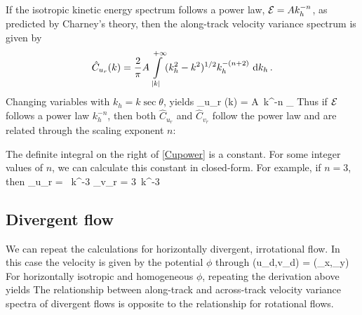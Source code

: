 \documentclass[12pt]{article}
\begin{document}
If the isotropic kinetic energy spectrum follows a power law, $\mathcal{E} = A k_h^{-n}$, as predicted by Charney's theory, then the along-track velocity variance spectrum is given by 
\begin{align}
 \hat{C}_{u_r} (k) = \frac{2}{\pi} A \int\limits_{|k|}^{+\infty} (k_h^2 - k^2)^{1/2} k_h^{-(n +2)}  \,\,{\rm d} k_h\, .
\end{align}
Changing variables with $k_h = k \sec \theta$, yields 
\beq \label{Cupower}
 _{u_r} (k) =   A\, k^{-n} _{}\per 
\eeq
Thus if $\mathcal{E}$ follows a power law $k_h^{-n}$, then both $\hat{C}_{u_r}$ and $\hat{C}_{v_r}$ follow the  power law and are related through the scaling exponent $n$:
\beq 
{} \per 
\eeq

The definite integral on the right of \eqref{Cupower} is a constant. For some integer values of $n$, we can calculate this constant in closed-form. For example, if $n=3$, then
\beq 
 _{u_r} = \, k^{-3}\qquad {} \qquad 
 _{v_r} = 3\, k^{-3}\per
\eeq

\subsection*{Divergent flow}
We can repeat the calculations for horizontally divergent, irrotational flow. In this case the velocity is given by the potential $\phi$ through
\beq 
\label{uvpsi}
(u_d,v_d) = (\phi_x,\phi_y)\per
\eeq
For horizontally isotropic and homogeneous $\phi$, repeating the derivation above yields
\beq \label{CuCv2}
\per
\eeq
The relationship between along-track and across-track velocity variance spectra of divergent flows is opposite to the relationship for rotational flows.
\end{document}
